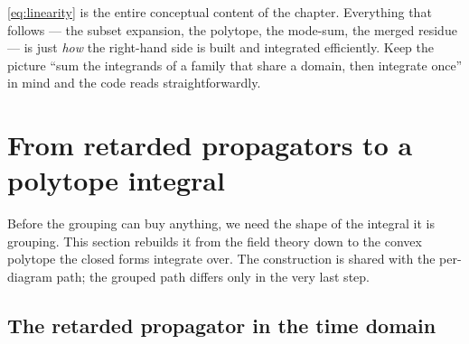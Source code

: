 \begin{note}
\eqref{eq:linearity} is the entire conceptual content of the chapter. Everything
that follows --- the subset expansion, the polytope, the mode-sum, the merged
residue --- is just \emph{how} the right-hand side is built and integrated
efficiently. Keep the picture ``sum the integrands of a family that share a
domain, then integrate once'' in mind and the code reads straightforwardly.
\end{note}

\section{From retarded propagators to a polytope integral}

Before the grouping can buy anything, we need the shape of the integral it is
grouping. This section rebuilds it from the field theory down to the convex
polytope the closed forms integrate over. The construction is shared with the
per-diagram path; the grouped path differs only in the very last step.

\subsection{The retarded propagator in the time domain}

